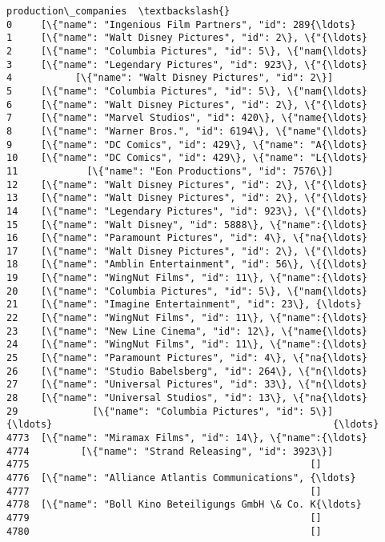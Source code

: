 \documentclass[11pt]{article}
\begin{document}
\begin{Verbatim}[commandchars=\\\{\}]
                                   production\_companies  \textbackslash{}
0     [\{"name": "Ingenious Film Partners", "id": 289{\ldots}   
1     [\{"name": "Walt Disney Pictures", "id": 2\}, \{"{\ldots}   
2     [\{"name": "Columbia Pictures", "id": 5\}, \{"nam{\ldots}   
3     [\{"name": "Legendary Pictures", "id": 923\}, \{"{\ldots}   
4           [\{"name": "Walt Disney Pictures", "id": 2\}]   
5     [\{"name": "Columbia Pictures", "id": 5\}, \{"nam{\ldots}   
6     [\{"name": "Walt Disney Pictures", "id": 2\}, \{"{\ldots}   
7     [\{"name": "Marvel Studios", "id": 420\}, \{"name{\ldots}   
8     [\{"name": "Warner Bros.", "id": 6194\}, \{"name"{\ldots}   
9     [\{"name": "DC Comics", "id": 429\}, \{"name": "A{\ldots}   
10    [\{"name": "DC Comics", "id": 429\}, \{"name": "L{\ldots}   
11            [\{"name": "Eon Productions", "id": 7576\}]   
12    [\{"name": "Walt Disney Pictures", "id": 2\}, \{"{\ldots}   
13    [\{"name": "Walt Disney Pictures", "id": 2\}, \{"{\ldots}   
14    [\{"name": "Legendary Pictures", "id": 923\}, \{"{\ldots}   
15    [\{"name": "Walt Disney", "id": 5888\}, \{"name":{\ldots}   
16    [\{"name": "Paramount Pictures", "id": 4\}, \{"na{\ldots}   
17    [\{"name": "Walt Disney Pictures", "id": 2\}, \{"{\ldots}   
18    [\{"name": "Amblin Entertainment", "id": 56\}, \{{\ldots}   
19    [\{"name": "WingNut Films", "id": 11\}, \{"name":{\ldots}   
20    [\{"name": "Columbia Pictures", "id": 5\}, \{"nam{\ldots}   
21    [\{"name": "Imagine Entertainment", "id": 23\}, {\ldots}   
22    [\{"name": "WingNut Films", "id": 11\}, \{"name":{\ldots}   
23    [\{"name": "New Line Cinema", "id": 12\}, \{"name{\ldots}   
24    [\{"name": "WingNut Films", "id": 11\}, \{"name":{\ldots}   
25    [\{"name": "Paramount Pictures", "id": 4\}, \{"na{\ldots}   
26    [\{"name": "Studio Babelsberg", "id": 264\}, \{"n{\ldots}   
27    [\{"name": "Universal Pictures", "id": 33\}, \{"n{\ldots}   
28    [\{"name": "Universal Studios", "id": 13\}, \{"na{\ldots}   
29             [\{"name": "Columbia Pictures", "id": 5\}]   
{\ldots}                                                 {\ldots}   
4773  [\{"name": "Miramax Films", "id": 14\}, \{"name":{\ldots}   
4774         [\{"name": "Strand Releasing", "id": 3923\}]   
4775                                                 []   
4776  [\{"name": "Alliance Atlantis Communications", {\ldots}   
4777                                                 []   
4778  [\{"name": "Boll Kino Beteiligungs GmbH \& Co. K{\ldots}   
4779                                                 []   
4780                                                 []   

\end{Verbatim}
\end{document}
